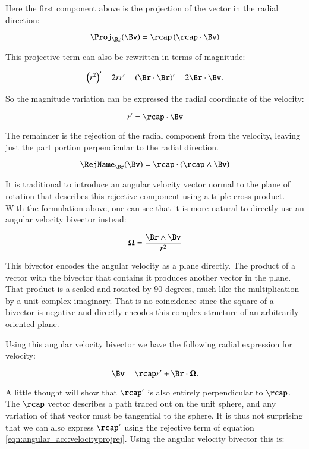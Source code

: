 Here the first component above is the projection of the vector in the radial direction:

\[
\Proj_{\Br}(\Bv) = \rcap \left(\rcap \cdot \Bv\right)
\]

This projective term can also be rewritten in terms of magnitude:

\[
\left(r^2\right)' = 2 r r' = \left(\Br \cdot \Br\right)' = 2 \Br \cdot \Bv.
\]

So the magnitude variation can be expressed the radial coordinate of the velocity:

\begin{equation}\label{eqn:angular_acc:rprime}
r' = \rcap \cdot \Bv
\end{equation}

The remainder is the rejection of the radial component from the velocity, leaving just the part
portion perpendicular to the radial direction.

\[
\RejName_{\Br}(\Bv) = \rcap \cdot \left(\rcap \wedge \Bv\right)
\]

It is traditional to introduce an angular velocity vector normal to the plane of rotation
that describes this rejective component using a triple cross product.  With the formulation above, 
one can see that it is more natural to directly use an angular velocity bivector instead:

\begin{equation}
\BOmega = \frac{\Br \wedge \Bv}{r^2}
\end{equation}

This bivector encodes the
angular velocity as a plane directly.  The
product of a vector with the bivector that contains it produces another vector
in the plane.  That product is a scaled and rotated by 90 degrees, much like the
multiplication by a unit complex imaginary.  That is no coincidence since
the square of a bivector is negative and directly encodes this complex structure
of an arbitrarily oriented plane.

Using this angular velocity bivector we have the following radial expression for velocity:

\begin{equation}\label{eqn:angular_acc:velocityomega}
\Bv = \rcap r' + \Br \cdot \BOmega.
\end{equation}

A little thought will show that $\rcap'$ is also entirely perpendicular to $\rcap$.  The $\rcap$ vector describes
a path traced out on the unit sphere, and any variation of that vector must be tangential to the sphere.
It is thus not surprising that we can also express $\rcap'$ using the rejective term of equation
\ref{eqn:angular_acc:velocityprojrej}.  Using the angular velocity bivector this is:

